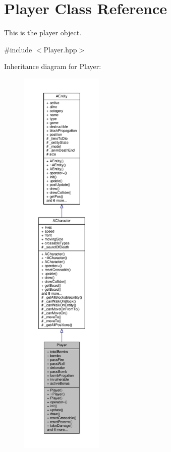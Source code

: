 \hypertarget{class_player}{}\section{Player Class Reference}
\label{class_player}


This is the player object.  




{\ttfamily \#include $<$Player.\+hpp$>$}



Inheritance diagram for Player\+:
\nopagebreak
\begin{figure}[H]
\begin{center}
\leavevmode
\includegraphics[height=550pt]{class_player__inherit__graph}
\end{center}
\end{figure}


